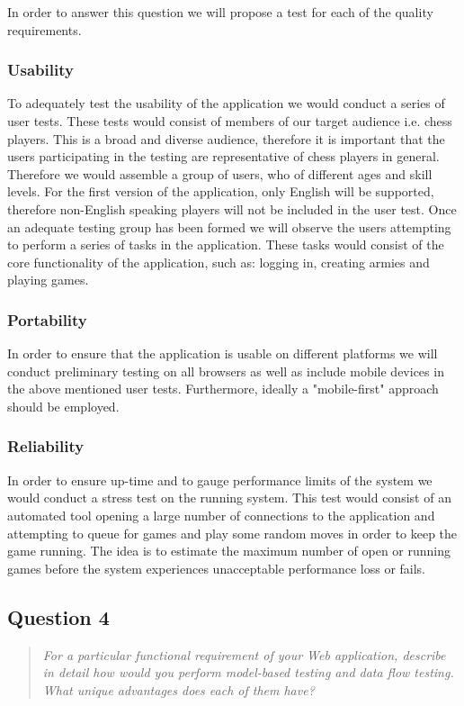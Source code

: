\documentclass[10pt,a4paper]{report}
\begin{document}
In order to answer this question we will propose a test for each of the quality requirements.
\subsubsection*{Usability}
To adequately test the usability of the application we would conduct a series of user tests. These tests would consist of members of our target audience i.e. chess players. This is a broad and diverse audience, therefore it is important that the users participating in the testing are representative of chess players in general. Therefore we would assemble a group of users, who of different ages and skill levels. For the first version of the application, only English will be supported, therefore non-English speaking players will not be included in the user test. Once an adequate testing group has been formed we will observe the users attempting to perform a series of tasks in the application. These tasks would consist of the core functionality of the application, such as: logging in, creating armies and playing games.

\subsubsection*{Portability}
In order to ensure that the application is usable on different platforms we will conduct preliminary testing on all browsers as well as include mobile devices in the above mentioned user tests. Furthermore, ideally a "mobile-first" approach should be employed.

\subsubsection*{Reliability}
In order to ensure up-time and to gauge performance limits of the system we would conduct a stress test on the running system. This test would consist of an automated tool opening a large number of connections to the application and attempting to queue for games and play some random moves in order to keep the game running. The idea is to estimate the maximum number of open or running games before the system experiences unacceptable performance loss or fails. 

\subsection*{Question 4}
\begin{quote}
	\textit{For a particular functional requirement of your Web application, describe in detail how would you perform model-based testing and data flow testing. What unique advantages does each of them have?}
\end{quote}
\end{document}
